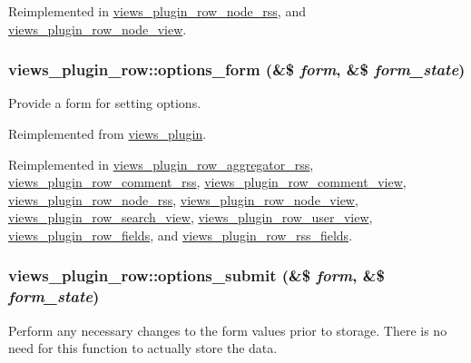 Reimplemented in \hyperlink{classviews__plugin__row__node__rss_a6abed6bfad84d5caca74f5dba8911437}{views\_\-plugin\_\-row\_\-node\_\-rss}, and \hyperlink{classviews__plugin__row__node__view_a3bb6fb204cefdab520d24765a8f916ba}{views\_\-plugin\_\-row\_\-node\_\-view}.\hypertarget{classviews__plugin__row_a6914c39d64977a0aa71da39cc1af004e}{
\subsubsection[{options\_\-form}]{\setlength{\rightskip}{0pt plus 5cm}views\_\-plugin\_\-row::options\_\-form (\&\$ {\em form}, \/  \&\$ {\em form\_\-state})}}
\label{classviews__plugin__row_a6914c39d64977a0aa71da39cc1af004e}
Provide a form for setting options. 

Reimplemented from \hyperlink{classviews__plugin_a1aaed8da1afd9f45293a37358c159837}{views\_\-plugin}.

Reimplemented in \hyperlink{classviews__plugin__row__aggregator__rss_aa5c9bce3143901863f1a446b622fda9c}{views\_\-plugin\_\-row\_\-aggregator\_\-rss}, \hyperlink{classviews__plugin__row__comment__rss_a6901603f7a3b8765dff9ac0b5d8208e4}{views\_\-plugin\_\-row\_\-comment\_\-rss}, \hyperlink{classviews__plugin__row__comment__view_a7dd276ec1a14a2d34f80a8020557608a}{views\_\-plugin\_\-row\_\-comment\_\-view}, \hyperlink{classviews__plugin__row__node__rss_a074125b7562bb918124c2dae6322f58e}{views\_\-plugin\_\-row\_\-node\_\-rss}, \hyperlink{classviews__plugin__row__node__view_a7bc31b38a1cc4474695af3a564fde775}{views\_\-plugin\_\-row\_\-node\_\-view}, \hyperlink{classviews__plugin__row__search__view_a2d2e479f414c487aff3d88343274b49b}{views\_\-plugin\_\-row\_\-search\_\-view}, \hyperlink{classviews__plugin__row__user__view_a3e0109e3008d06d56386d8aba10147c3}{views\_\-plugin\_\-row\_\-user\_\-view}, \hyperlink{classviews__plugin__row__fields_abb87b6c98697fb676638759cb95072e3}{views\_\-plugin\_\-row\_\-fields}, and \hyperlink{classviews__plugin__row__rss__fields_ab1747e15303777895d87d7cc8f37a788}{views\_\-plugin\_\-row\_\-rss\_\-fields}.\hypertarget{classviews__plugin__row_adce2d15d7f422a48477c6fdf43de80ee}{
\subsubsection[{options\_\-submit}]{\setlength{\rightskip}{0pt plus 5cm}views\_\-plugin\_\-row::options\_\-submit (\&\$ {\em form}, \/  \&\$ {\em form\_\-state})}}
\label{classviews__plugin__row_adce2d15d7f422a48477c6fdf43de80ee}
Perform any necessary changes to the form values prior to storage. There is no need for this function to actually store the data. 

